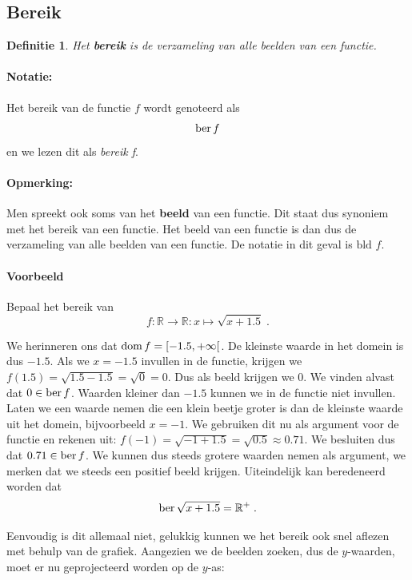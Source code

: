 \documentclass[12pt,twoside]{article}
\newtheorem{definition}{Definitie}
\begin{document}
\begin{theorie}

\subsection{Bereik}

\begin{definition}
  Het {\bf bereik} is de verzameling van alle beelden van een functie.
\end{definition}

\paragraph{Notatie:} Het bereik van de functie $f$ wordt genoteerd als $$\ber f$$ en we lezen dit als {\em bereik f}.

\paragraph{Opmerking:} Men spreekt ook soms van het {\bf beeld} van een functie. Dit staat dus synoniem met het bereik van een functie. Het beeld van een functie is dan dus de verzameling van alle beelden van een functie. De notatie in dit geval is $\mbox{bld }f$.

\paragraph{Voorbeeld} Bepaal het bereik van $$f:\mathbb{R}\to\mathbb{R}:x\mapsto \sqrt{x+1.5}\;.$$

We herinneren ons dat $\dom f = [-1.5,+\infty[$. De kleinste waarde in het domein is dus $-1.5$. Als we $x=-1.5$ invullen in de functie, krijgen we $f(1.5)=\sqrt{1.5-1.5}=\sqrt{0}=0$. Dus als beeld krijgen we $0$. We vinden alvast dat $0\in\ber f$. Waarden kleiner dan $-1.5$ kunnen we in de functie niet invullen. Laten we een waarde nemen die een klein beetje groter is dan de kleinste waarde uit het domein, bijvoorbeeld $x=-1$. We gebruiken dit nu als argument voor de functie en rekenen uit: $f(-1)=\sqrt{-1+1.5}=\sqrt{0.5}\approx0.71$. We besluiten dus dat $0.71\in\ber f$. We kunnen dus steeds grotere waarden nemen als argument, we merken dat we steeds een positief beeld krijgen. Uiteindelijk kan beredeneerd worden dat
$$\ber \sqrt{x+1.5}=\mathbb{R}^+\;.$$

Eenvoudig is dit allemaal niet, gelukkig kunnen we het bereik ook snel aflezen met behulp van de grafiek. Aangezien we de beelden zoeken, dus de $y$-waarden, moet er nu geprojecteerd worden op de $y$-as:


\end{theorie}
\end{document}
